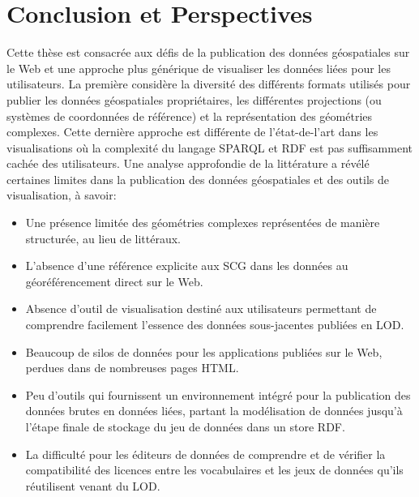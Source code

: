 \documentclass[a4paper,11pt,twoside]{report}
\begin{document}
\chapter*{ Conclusion et Perspectives}
\label{ch:conc}


Cette thèse est consacrée aux défis de la publication des données géospatiales sur le Web et une approche plus générique de visualiser les données liées pour les utilisateurs. La première considère la diversité des différents formats utilisés pour publier les données géospatiales propriétaires, les différentes projections (ou systèmes de coordonnées de référence) et la représentation des géométries complexes. Cette dernière approche est différente de l'état-de-l'art dans les visualisations où la complexité du langage SPARQL et RDF est pas suffisamment cachée des utilisateurs. Une analyse approfondie de la littérature a révélé certaines limites dans la publication des données géospatiales et des outils de visualisation, à savoir:

\begin{itemize}
\item  
Une présence limitée des géométries complexes représentées de manière structurée, au lieu de littéraux.

\item 
L'absence d'une référence explicite aux SCG dans les données au géoréférencement direct sur le Web.

\item 
Absence d'outil de visualisation destiné aux utilisateurs permettant de comprendre facilement l'essence des données sous-jacentes publiées en LOD.

\item 
Beaucoup de silos de données pour les applications publiées sur le Web, perdues dans de nombreuses pages HTML.

\item 
Peu d'outils qui fournissent un environnement intégré pour la publication des données brutes en données liées, partant la modélisation de données jusqu'à l'étape finale de stockage du jeu de données dans un store RDF. 

\item La difficulté pour les éditeurs de données de comprendre et de vérifier la compatibilité des licences entre les vocabulaires et les jeux de données qu'ils réutilisent venant du LOD.

  
\end{itemize}
 
\end{document}
